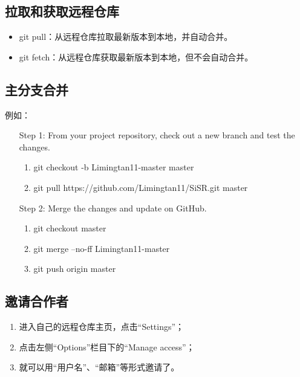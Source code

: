\subsection{拉取和获取远程仓库}
\begin{itemize}
\item git pull：从远程仓库拉取最新版本到本地，并自动合并。
\item git fetch：从远程仓库获取最新版本到本地，但不会自动合并。
\end{itemize}


\subsection{主分支合并}
例如：
\begin{itemize}
\item[Step 1:] From your project repository, check out a new branch and test the changes.
\begin{enumerate}
\item git checkout -b Limingtan11-master master

\item git pull https://github.com/Limingtan11/SiSR.git master
\end{enumerate}

\item [Step 2:] Merge the changes and update on GitHub.
\begin{enumerate}
\item  git checkout master

\item git merge --no-ff Limingtan11-master

\item git push origin master
\end{enumerate}
\end{itemize}



\subsection{邀请合作者}
\begin{enumerate}
\item 进入自己的远程仓库主页，点击“Settings”；
\item 点击左侧“Options”栏目下的“Manage access”；
\item 就可以用“用户名”、“邮箱”等形式邀请了。
\end{enumerate}




